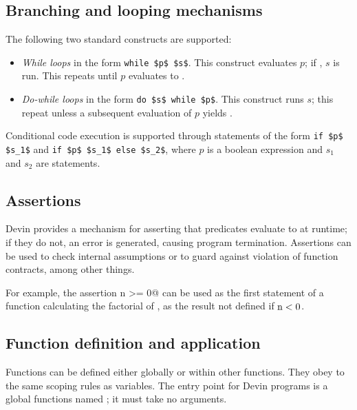 \documentclass[UdineBachThesis,american,11pt]{PhdThesis}
\begin{document}
  \subsection{Branching and looping mechanisms}

  The following two standard constructs are supported:

  \begin{itemize}
    \item \emph{While loops} in the form \lstinline[mathescape]@while $p$ $s$@.
    This construct evaluates $p$; if \lstinline@true@, $s$ is run. This repeats
    until $p$ evaluates to \lstinline@false@.

    \item \emph{Do-while loops} in the form
    \lstinline[mathescape]@do $s$ while $p$@. This construct runs $s$; this
    repeat unless a subsequent evaluation of $p$ yields \lstinline@false@.
  \end{itemize}

  Conditional code execution is supported through statements of the form
  \lstinline[mathescape]@if $p$ $s_1$@ and
  \lstinline[mathescape]@if $p$ $s_1$ else $s_2$@, where $p$ is a boolean
  expression and $s_1$ and $s_2$ are statements.

  \subsection{Assertions}

  Devin provides a mechanism for asserting that predicates evaluate to
  \lstinline@true@ at runtime; if they do not, an error is generated, causing
  program termination. Assertions can be used to check internal assumptions or
  to guard against violation of function contracts, among other things.

  For example, the assertion \lstinline@assert n >= 0@ can be used as the first
  statement of a function calculating the factorial of \lstinline@n@, as the
  result not defined if $\text{\lstinline@n@} < 0$.

  \subsection{Function definition and application}

  Functions can be defined either globally or within other functions. They obey
  to the same scoping rules as variables. The entry point for Devin programs is
  a global functions named \lstinline@main@; it must take no arguments.
\end{document}
